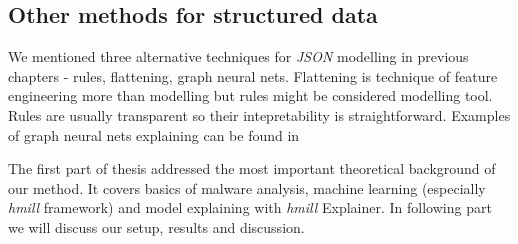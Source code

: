 \subsection{Other methods for structured data}
We mentioned three alternative techniques for \emph{JSON} modelling in previous chapters - rules, flattening, graph neural nets. Flattening is technique of feature engineering more than modelling but rules might be considered modelling tool. Rules are usually transparent so their intepretability is straightforward. Examples of graph neural nets explaining can be found in \cite{Ying2019, Huang2020} 

The first part of thesis addressed the most important theoretical background of our method. It covers basics of malware analysis, machine learning (especially \emph{hmill} framework) and model explaining with \emph{hmill} Explainer. In following part we will discuss our setup, results and discussion.





